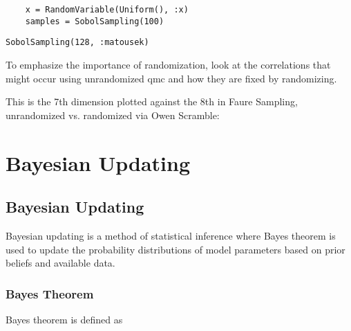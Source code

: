 \begin{verbatim}
    x = RandomVariable(Uniform(), :x)
    samples = SobolSampling(100)
\end{verbatim}


\begin{verbatim}
SobolSampling(128, :matousek)
\end{verbatim}



To emphasize the importance of randomization, look at the correlations that might occur using unrandomized qmc and how they are fixed by randomizing.



This is the 7th dimension plotted against the 8th in Faure Sampling, unrandomized vs. randomized via Owen Scramble:







\begin{figure}
\centering
{}
\caption{}
\end{figure}




\chapter{Bayesian Updating}


\section{Bayesian Updating}



\label{16081037215275166927}{}


Bayesian updating is a method of statistical inference where Bayes{\textquotesingle} theorem is used to update the probability distributions of model parameters based on prior beliefs and available data.



\subsection{Bayes{\textquotesingle} Theorem}



\label{537349271097409493}{}


Bayes{\textquotesingle} theorem is defined as



